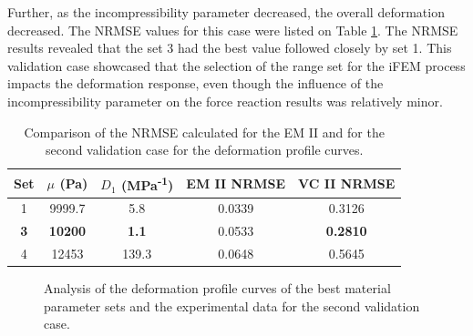 Further, as the incompressibility parameter decreased, the overall deformation decreased. The 
NRMSE values for this case were listed on Table \ref{tab:nrmsedefprof}. The NRMSE results 
revealed that the set \SI{3}{} had the best value followed closely by set \SI{1}{}. This validation case 
showcased that the selection of the range set for the iFEM process impacts the deformation response, even though the
influence of the incompressibility parameter on the force reaction results was relatively minor.\\
\begin{table}[ht!]
    \centering
    \begin{tabular}{|c|c|c|c|c|}
    \hline
    Set & $\mu$ (Pa) & $D_1$ (MPa\textsuperscript{-1}) & EM II NRMSE & VC II NRMSE\\
    \hline
    1 & 9999.7 & 5.8 & 0.0339 & 0.3126\\
    \textbf{3} & \textbf{10200} & \textbf{1.1} & 0.0533 & \textbf{0.2810}\\
    4 & 12453 & 139.3 & 0.0648 & 0.5645\\
    \hline
    \end{tabular}
    \caption[NRMSE for second validation case]{Comparison of the NRMSE calculated for the EM II and for the second validation case for the deformation profile curves.}
	\label{tab:nrmsedefprof}
\end{table}

\begin{figure}%
    \centering
   \quad
   \caption[Second validation case measurement data]{Analysis of the deformation profile curves of the best material parameter sets and the experimental data for the second validation case.}%
   \label{fig:defprofiledata}%
\end{figure}

